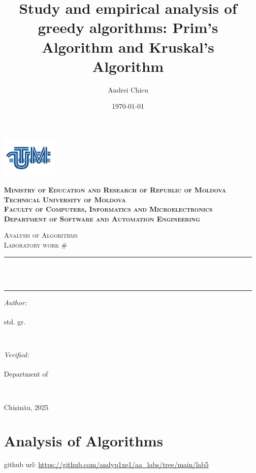 \documentclass[a4paper,12pt]{article}
\author{Andrei Chicu}
\date{\today}
\title{Study and empirical analysis of greedy algorithms: Prim's Algorithm and Kruskal's Algorithm}
\begin{document}
\makeatletter
\begin{titlepage}
\centering

\includegraphics[height=2cm]{utm_logo.png}

\bfseries
\textsc{Ministry of Education and Research of Republic of Moldova} \\
\textsc{Technical University of Moldova} \\
\textsc{Faculty of Computers, Informatics and Microelectronics} \\
\textsc{Department of Software and Automation Engineering} \\
\mdseries

\vfill

\textsc{\Large Analysis of Algorithms} \\
\textsc{\large Laboratory work \#\@labno}\\[0.5cm]

\vspace{12pt}
\newcommand{\HRule}{\rule{\linewidth}{0.5mm}}
\HRule \\[0.2cm]
{ \LARGE \bfseries \@title }\\[0.4cm]
\HRule
\vfill

\begin{minipage}[t]{0.4\textwidth}
\begin{flushleft} \large
\emph{Author:} \\
\@author\\                        
std. gr. \@group
\end{flushleft}
\end{minipage}
~
\begin{minipage}[t]{0.4\textwidth}
\raggedleft \large
\emph{Verified:} \\
\@prof \\
Department of \textsc{\@profdep}
\end{minipage}\\[3cm]
\vfill

Chișinău, 2025
\end{titlepage}
\makeatother
\setcounter{page}{2}
\section{Analysis of Algorithms}
\label{sec:orgf3bae42}
github url: \url{https://github.com/andyp1xe1/aa_labs/tree/main/lab5}
\end{document}
